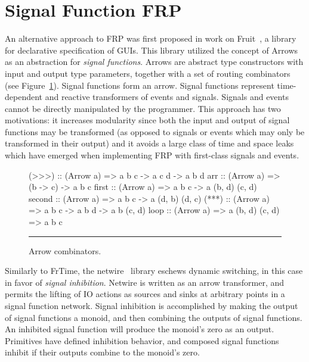 \section{Signal Function FRP}
\label{section:Background-signal_function_frp}

An alternative approach to FRP was first proposed in work on
Fruit~\cite{Courtney2001-1}, a library for declarative specification of GUIs.
This library utilized the concept of Arrows~\cite{Hughes2000} as an abstraction
for {\em signal functions}. Arrows are abstract type constructors with input and
output type parameters, together with a set of routing combinators (see Figure~\ref{figure:arrow_combinators}).
Signal functions form an arrow. Signal functions represent time-dependent and
reactive transformers of events and signals. Signals and events
cannot be directly manipulated by the programmer. This approach has two
motivations: it increases modularity since both the input and output of signal
functions may be transformed (as opposed to signals or events which may only be
transformed in their output) and it avoids a large class of time and space leaks
which have emerged when implementing FRP with first-class signals and events.

\begin{figure}
\begin{code}
(>>>)  :: (Arrow a) => a b c -> a c d -> a b d
arr    :: (Arrow a) => (b -> c) -> a b c
first  :: (Arrow a) => a b c -> a (b, d) (c, d)
second :: (Arrow a) => a b c -> a (d, b) (d, c)
(***)  :: (Arrow a) => a b c -> a b d -> a b (c, d)
loop   :: (Arrow a) => a (b, d) (c, d) => a b c
\end{code}
\hrule
\caption{Arrow combinators.}
\label{figure:arrow_combinators}
\end{figure}

Similarly to FrTime, the netwire~\cite{Soylemez} library eschews dynamic
switching, in this case in favor of {\em signal inhibition}. Netwire is written
as an arrow transformer, and permits the lifting of IO actions as sources and
sinks at arbitrary points in a signal function network. Signal inhibition is
accomplished by making the output of signal functions a monoid, and then
combining the outputs of signal functions. An inhibited signal function will
produce the monoid's zero as an output. Primitives have defined inhibition
behavior, and composed signal functions inhibit if their outputs combine to the
monoid's zero.

